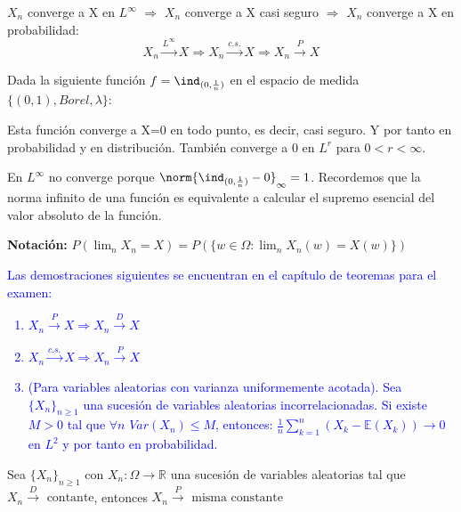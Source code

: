 \documentclass{apuntes}
\begin{document}
$X_n$ converge a X en $L^{\infty}$ $\Rightarrow$ $X_n$ converge a X casi seguro $\Rightarrow$ $X_n$ converge a X en probabilidad:
\[
X_n \stackrel{L^{\infty}}{\rightarrow} X \Rightarrow X_n \stackrel{c.s.}{\rightarrow} X \Rightarrow X_n \stackrel{P}{\rightarrow} X
\]

\begin{example}
Dada la siguiente función $f=\ind_{(0,\frac{1}{n})}$ en el espacio de medida $\{(0,1), Borel, \lambda\}$:

Esta función converge a X=0 en todo punto, es decir, casi seguro. Y por tanto en probabilidad y en distribución. También converge a 0 en $L^r$ para $0<r<\infty$.

En $L^{\infty}$ no converge porque $\norm{\ind_{(0, \frac{1}{n})}-0}_{\infty} = 1$. Recordemos que la norma infinito de una función es equivalente a calcular el supremo esencial del valor absoluto de la función.
\end{example}

\textbf{Notación:} $P(\lim_n X_n=X) = P(\{w \in \Omega: \lim_n X_n(w)=X(w)\})$

\textcolor{blue}{Las demostraciones siguientes se encuentran en el capítulo de teoremas para el examen:
\begin{enumerate}
\item $X_n \stackrel{P}{\rightarrow} X  \Rightarrow X_n \stackrel{D}{\rightarrow} X$
\item $X_n \stackrel{c.s.}{\rightarrow} X  \Rightarrow X_n \stackrel{P}{\rightarrow} X$
\item (Para variables aleatorias con varianza uniformemente acotada). Sea $\{X_n\}_{n\geq 1}$ una sucesión de variables aleatorias incorrelacionadas. Si existe $M>0$ tal que $\forall n$ $Var(X_n)\leq M$, entonces: $\frac{1}{n}\sum_{k=1}^{n}(X_k -\mathbb{E}(X_k)) \rightarrow 0$ en $L^2$ y por tanto en probabilidad.
\end{enumerate}}

\begin{theorem}
Sea $\{X_n\}_{n \geq 1}$ con $X_n: \Omega \rightarrow \mathbb{R}$ una sucesión de variables aleatorias tal que $X_n \stackrel{D}{\rightarrow} \text{ contante}$, entonces $X_n \stackrel{P}{\rightarrow} \text{ misma constante }$
\end{theorem}
\end{document}
